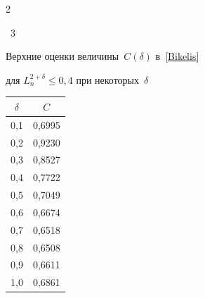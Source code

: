 \begin{multicols}{2}


\noindent %


\begin{center}


\parbox{37mm}{{\tablename~3}\ \ \small{Верхние оценки величины~$C(\delta)$ в~\eqref{Bikelis}


для $L_n^{2+\delta}\le0{,}4$ при некоторых~$\delta$}}


\end{center}


\vspace*{-6pt}





{\small


\begin{center}


\tabcolsep=15.5pt


\begin{tabular}{|c|c|}


\hline


$\delta$& $C$\\


\hline


0,1&0,6995\\


0,2&0,9230\\


0,3&0,8527\\


0,4&0,7722\\


0,5&0,7049\\


0,6&0,6674\\


0,7&0,6518\\


0,8&0,6508\\


0,9&0,6611\\


1,0&0,6861\\


 \hline


\end{tabular}


\end{center}




}





\end{multicols}
